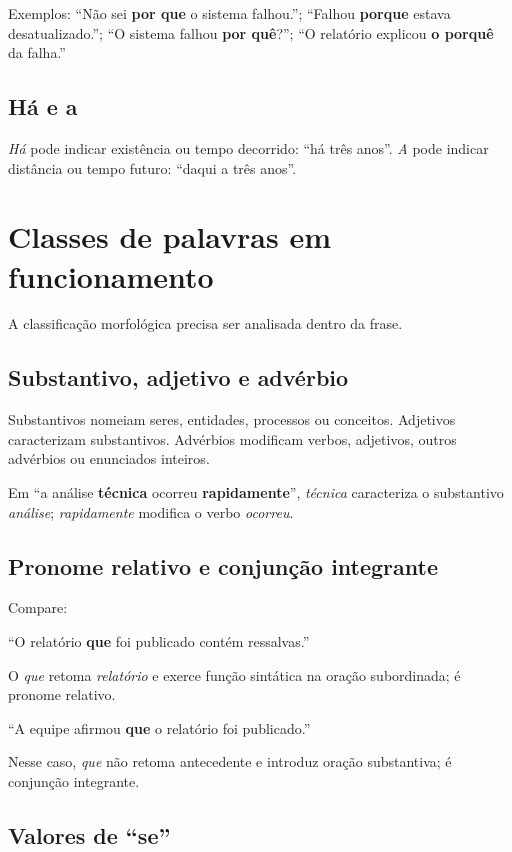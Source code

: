 Exemplos: ``Não sei \textbf{por que} o sistema falhou.''; ``Falhou \textbf{porque} estava desatualizado.''; ``O sistema falhou \textbf{por quê}?''; ``O relatório explicou \textbf{o porquê} da falha.''

\subsection{Há e a}

\emph{Há} pode indicar existência ou tempo decorrido: ``há três anos''. \emph{A} pode indicar distância ou tempo futuro: ``daqui a três anos''.

\section{Classes de palavras em funcionamento}

A classificação morfológica precisa ser analisada dentro da frase.

\subsection{Substantivo, adjetivo e advérbio}

Substantivos nomeiam seres, entidades, processos ou conceitos. Adjetivos caracterizam substantivos. Advérbios modificam verbos, adjetivos, outros advérbios ou enunciados inteiros.

Em ``a análise \textbf{técnica} ocorreu \textbf{rapidamente}'', \emph{técnica} caracteriza o substantivo \emph{análise}; \emph{rapidamente} modifica o verbo \emph{ocorreu}.

\subsection{Pronome relativo e conjunção integrante}

Compare:

``O relatório \textbf{que} foi publicado contém ressalvas.''

O \emph{que} retoma \emph{relatório} e exerce função sintática na oração subordinada; é pronome relativo.

``A equipe afirmou \textbf{que} o relatório foi publicado.''

Nesse caso, \emph{que} não retoma antecedente e introduz oração substantiva; é conjunção integrante.

\subsection{Valores de ``se''}

